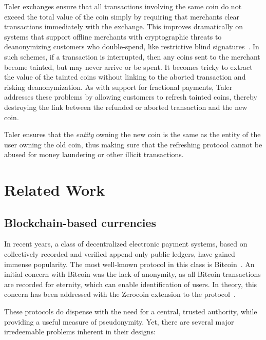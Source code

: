 \documentclass{llncs}
\begin{document}
Taler exchanges ensure that all transactions involving the same coin
do not exceed the total value of the coin simply by
requiring that merchants clear transactions immediately with the exchange.
This improves dramatically on systems that support offline merchants with
cryptographic threats to deanonymizing customers who double-spend, like
restrictive blind signatures~\cite{brands1993efficient}.
In such schemes, if a transaction is interrupted, then any coins sent to
the merchant become tainted, but may never arrive or be spent.
It becomes tricky to extract the value of the tainted coins without linking
to the aborted transaction and risking deanonymization.
As with support for fractional payments, Taler addresses these problems by
allowing customers to refresh tainted coins, thereby destroying the link
between the refunded or aborted transaction and the new coin.

Taler ensures that the {\em entity} owning the new coin is
the same as the entity of the user owning the old coin, thus making
sure that the refreshing protocol cannot be abused for money
laundering or other illicit transactions.


\section{Related Work}

\subsection{Blockchain-based currencies}

In recent years, a class of decentralized electronic payment systems,
based on collectively recorded and verified append-only public
ledgers, have gained immense popularity.  The most well-known protocol
in this class is Bitcoin~\cite{nakamoto2008bitcoin}.  An initial
concern with Bitcoin was the lack of anonymity, as all Bitcoin
transactions are recorded for eternity, which can enable
identification of users.  In theory, this concern has been addressed
with the Zerocoin extension to the protocol~\cite{miers2013zerocoin}.

These protocols do dispense with the need for a central, trusted
authority, while providing a useful measure of pseudonymity.
Yet, there are several major irredeemable problems inherent in their designs:
\end{document}
